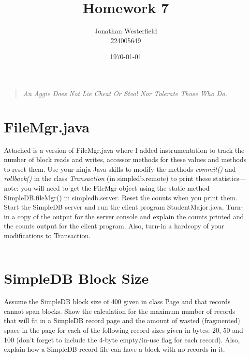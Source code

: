 \documentclass [letterpaper,12pt] {article}
\begin{document}
\title{
    \huge{Homework 7}
}
\author{
    Jonathan Westerfield \\
    224005649
}
\date{\today}
\maketitle

\begin{quote}
\centering
\textit {
    An Aggie Does Not Lie Cheat Or Steal Nor Tolerate Those Who Do. \\
}
\vspace {1.4in}
\hrulefill
\end{quote}
\newpage

\section{FileMgr.java}
    Attached is a version of FileMgr.java where I added instrumentation 
    to track the number of block reads and writes, accessor methods for 
    these values and methods to reset them. Use your ninja Java skills 
    to modify the methods \textit{commit()} and \textit{rollback()} in 
    the class \textit{Transaction} 
    (in simpledb.remote) to print these statistics—note: you will need to 
    get the FileMgr object using the static method SimpleDB.fileMgr() in
    simpledb.server. Reset the counts when you print them. Start the 
    SimpleDB server and run the client program StudentMajor.java. Turn-in
    a copy of the output for the server console and explain the counts 
    printed and the counts output for the client program. Also, turn-in a 
    hardcopy of your modifications to Transaction.
    \\
    \\

\section{SimpleDB Block Size}
    Assume the SimpleDB block size of 400 given in class Page and that records
    cannot span blocks. Show the calculation for the maximum number of records
    that will fit in a SimpleDB record page and the amount of wasted 
    (fragmented) space in the page for each of the following record sizes
    given in bytes: 20, 50 and 100 (don’t forget to include the 4-byte 
    empty/in-use flag for each record). Also, explain how a SimpleDB record 
    file can have a block with no records in it.
    \\
    \\
\end{document}
